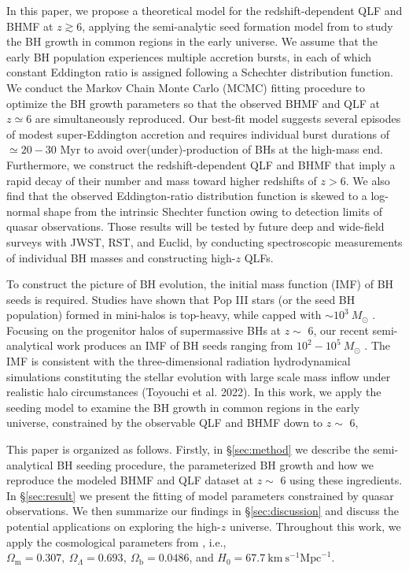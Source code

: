 \documentclass[twocolumn, twocolappendix]{aastex63}
\newcommand{\Msun}{M_\odot}
\begin{document}
\begin{CJK*}{UTF8}{gbsn}
In this paper, we propose a theoretical model for the redshift-dependent QLF and BHMF at $z\gtrsim 6$,
applying the semi-analytic seed formation model from \cite{2021ApJ...917...60L} to study the BH growth in common regions in the early universe.
We assume that the early BH population experiences multiple accretion bursts, in each of which constant Eddington ratio is assigned 
following a Schechter distribution function. 
We conduct the Markov Chain Monte Carlo (MCMC) fitting procedure to optimize the BH growth parameters 
so that the observed BHMF and QLF at $z\simeq 6$ are simultaneously reproduced. 
Our best-fit model suggests several episodes of modest super-Eddington accretion and requires
individual burst durations of $\simeq 20-30$ Myr to avoid over(under)-production of BHs at the high-mass end.
Furthermore, we construct the redshift-dependent QLF and BHMF that imply a rapid decay of 
their number and mass toward higher redshifts of $z>6$.
We also find that the observed Eddington-ratio distribution function is skewed to a log-normal shape from the intrinsic Shechter function
owing to detection limits of quasar observations.
Those results will be tested by future deep and wide-field surveys with JWST, RST, and Euclid,
by conducting spectroscopic measurements of individual BH masses and constructing high-$z$ QLFs.  



To construct the picture of BH evolution, the initial mass function (IMF) of BH seeds is required.
Studies have shown that Pop III stars (or the seed BH population) formed in mini-halos is top-heavy, while capped with $\sim 10^3~\Msun$ 
\citep{2014ApJ...781...60H,2015MNRAS.448..568H}.
Focusing on the progenitor halos of supermassive BHs at $z\sim$ 6, 
our recent semi-analytical work produces an IMF of BH seeds ranging from $10^2-10^5~\Msun$ \citep{2021ApJ...917...60L}. 
The IMF is consistent with the three-dimensional radiation hydrodynamical simulations 
constituting the stellar evolution with large scale mass inflow under realistic halo circumstances (Toyouchi et al. 2022).
In this work, we apply the seeding model to examine the BH growth in common regions in the early universe, 
constrained by the observable QLF and BHMF down to $z\sim$ 6, 
\fi




This paper is organized as follows. Firstly, in \S \ref{sec:method} we describe the semi-analytical BH seeding procedure, 
the parameterized BH growth and how we reproduce the modeled BHMF and QLF dataset at $z\sim$ 6 using these ingredients. 
In \S \ref{sec:result} we present the fitting of model parameters constrained by quasar observations. 
We then summarize our findings in \S \ref{sec:discussion} and discuss the potential applications on exploring the high-$z$ universe.
Throughout this work, we apply the cosmological parameters from \cite{2016A&A...594A..13P},
i.e., $\Omega_{\mathrm{m}}=0.307,~\Omega_{\Lambda}=0.693,~
\Omega_{\mathrm{b}}=0.0486$, and $H_0=67.7 \mathrm{~km} \mathrm{~s}^{-1} \mathrm{Mpc}^{-1}$.





\end{CJK*}
\end{document}
